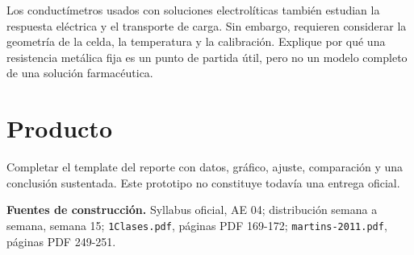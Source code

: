 \documentclass[11pt,letterpaper]{article}
\begin{document}
\begin{farmacia}
Los conductímetros usados con soluciones electrolíticas también estudian la
respuesta eléctrica y el transporte de carga. Sin embargo, requieren considerar
la geometría de la celda, la temperatura y la calibración. Explique por qué una
resistencia metálica fija es un punto de partida útil, pero no un modelo completo
de una solución farmacéutica.
\end{farmacia}

\section*{Producto}

Completar el template del reporte con datos, gráfico, ajuste, comparación y una
conclusión sustentada. Este prototipo no constituye todavía una entrega oficial.

\vspace{3pt}
{\small\textbf{Fuentes de construcción.}
Syllabus oficial, AE 04; distribución semana a semana, semana 15;
\texttt{1Clases.pdf}, páginas PDF 169-172; \texttt{martins-2011.pdf}, páginas
PDF 249-251.}
\end{document}
